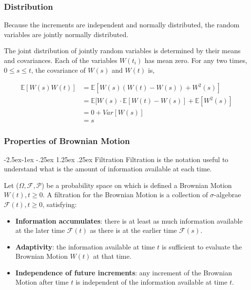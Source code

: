 \documentclass[paper=a4, fontsize=12pt]{scrartcl} %
\makeatletter
\numberwithin{equation}{section}
\renewcommand\paragraph{\@startsection{paragraph}{4}{\z@}%
            {-2.5ex\@plus -1ex \@minus -.25ex}%
            {1.25ex \@plus .25ex}%
            {\normalfont\normalsize\bfseries}}
\makeatother
\begin{document}
\subsubsection{Distribution}
Because the increments are independent and normally distributed, the random variables are jointly normally distributed. \par
The joint distribution of jointly random variables is determined by their means and covariances. Each of the variables ${W}(t_i)$ has mean zero. For any two times, $0 \leq s \leq t$, the covariance of ${W}(s)$ and ${W}(t)$ is, 

		\begin{equation}	
		\begin{aligned}
			\mathbb{E}[{W}(s){W}(t)]   &= \mathbb{E}[{W}(s) ({W}(t) - {W}(s)) + {W}^2(s)] \\
								&= \mathbb{E}[{W}(s) \cdot \mathbb {E}[{W}(t) - {W}(s)] + \mathbb{E}[{W}^2(s)] \\
								&= 0 + Var[W(s)] \\
								&= s
		\end{aligned}
		\end{equation}

\subsubsection{Properties of Brownian Motion}
\paragraph{Filtration}
Filtration is the notation useful to understand what is the amount of information available at each time.\par
Let ($\Omega, \mathcal{F}, \mathcal{P}$) be a probability space on which is defined a Brownian Motion $W(t), t \geq 0$. A filtration for the Brownian Motion is a collection of $\sigma$-algebrae $\mathcal{F}(t), t \geq 0$, satisfying:
	\begin{itemize}
		\item \textbf{Information accumulates}: there is at least as much information available at the later time $\mathcal{F}(t)$ as there is at the earlier time $\mathcal{F}(s)$.
		\item \textbf{Adaptivity}: the information available at time $t$ is sufficient to evaluate the Brownian Motion $W(t)$ at that time.
		\item \textbf{Independence of future increments}: any increment of the Brownian Motion after time $t$ is independent of the information available at time $t$.
	\end{itemize}
\end{document}
